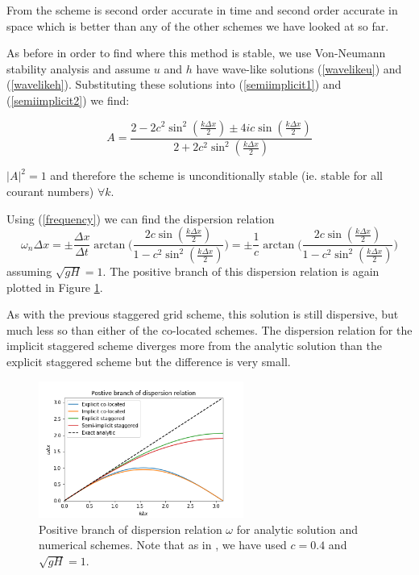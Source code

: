 \documentclass[a4paper,12pt, notitlepage]{article}
\begin{document}
From \cite{implicit} the scheme is second order accurate in time and second order accurate in space which is better than any of the other schemes we have looked at so far.

As before in order to find where this method is stable, we use Von-Neumann stability analysis and assume $u$ and $h$ have wave-like solutions (\ref{wavelikeu}) and (\ref{wavelikeh}). Substituting these solutions into (\ref{semiimplicit1}) and (\ref{semiimplicit2}) we find:

\begin{equation}
A = \frac{2 - 2c^{2}\sin^{2}(\frac{k\Delta x}{2}) \pm 4ic\sin(\frac{k\Delta x}{2})}{2 + 2 c^{2}\sin^{2}(\frac{k\Delta x}{2})}
\end{equation}

$\lvert A \rvert^{2} = 1$ and therefore the scheme is unconditionally stable (ie. stable for all courant numbers) $\forall k$.

Using (\ref{frequency}) we can find the dispersion relation
\begin{equation}
\omega_{n} \Delta x = \pm\frac{\Delta x}{\Delta t} \arctan\bigg(\frac{2 c \sin(\frac{k\Delta x}{2})}{1 - c^{2} \sin^{2}(\frac{k\Delta x}{2})}\bigg) = \pm\frac{1}{c} \arctan\bigg(\frac{2 c \sin(\frac{k\Delta x}{2})}{1 - c^{2} \sin^{2}(\frac{k\Delta x}{2})}\bigg)
\end{equation}
assuming $\sqrt{gH} = 1$. The positive branch of this dispersion relation is again plotted in Figure \ref{dispersionfigure}. 

As with the previous staggered grid scheme, this solution is still dispersive, but much less so than either of the co-located schemes. The dispersion relation for the implicit staggered scheme diverges more from the analytic solution than the explicit staggered scheme but the difference is very small. 

\begin{figure}[H]
	\begin{center}

	\centering
	\includegraphics[width=0.6\textwidth]{dispersion_relations.png}
	\caption{Positive branch of dispersion relation $\omega$ for analytic solution and numerical schemes. Note that as in \cite{MPE textbook}, we have used $c=0.4$ and $\sqrt{gH} = 1$.} \label{dispersionfigure}

	\end{center}
\end{figure}
\end{document}
